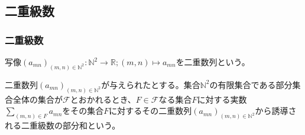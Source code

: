 \documentclass[dvipdfmx]{jsarticle}
\begin{document}
\subsection{二重級数}%
\subsubsection{二重級数}%
\begin{dfn}
写像$\left( a_{mn} \right)_{(m,n) \in \mathbb{N}^{2}}:\mathbb{N}^{2} \rightarrow \mathbb{R};(m,n) \mapsto a_{mn}$を二重数列という。
\end{dfn}
\begin{dfn}
二重数列$\left( a_{mn} \right)_{(m,n) \in \mathbb{N}^{2}}$が与えられたとする。集合$\mathbb{N}^{2}$の有限集合である部分集合全体の集合が$\mathcal{F}$とおかれるとき、$F \in \mathcal{F}$なる集合$F$に対する実数$\sum_{(m,n) \in F}a_{mn}$をその集合$F$に対するその二重数列$\left( a_{mn} \right)_{(m,n) \in \mathbb{N}^{2}}$から誘導される二重級数の部分和という。
\end{dfn}
\end{document}
